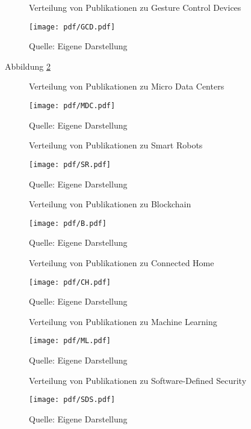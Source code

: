 \begin{figure}
	\centering
	\caption{Verteilung von Publikationen zu \glqq Gesture Control Devices\grqq}
	\texttt{[image: pdf/GCD.pdf]}
	\caption*{Quelle: Eigene Darstellung}
	\label{fig:gcd_pub}
\end{figure}

Abbildung \ref{fig:mdc_pub} 

\begin{figure}
	\centering
	\caption{Verteilung von Publikationen zu \glqq Micro Data Centers\grqq}
	\texttt{[image: pdf/MDC.pdf]}
	\caption*{Quelle: Eigene Darstellung}
	\label{fig:mdc_pub}
\end{figure}

\begin{figure}
	\centering
	\caption{Verteilung von Publikationen zu \glqq Smart Robots\grqq}
	\texttt{[image: pdf/SR.pdf]}
	\caption*{Quelle: Eigene Darstellung}
	\label{fig:sr_pub}
\end{figure}

\begin{figure}
	\centering
	\caption{Verteilung von Publikationen zu \glqq Blockchain\grqq}
	\texttt{[image: pdf/B.pdf]}
	\caption*{Quelle: Eigene Darstellung}
	\label{fig:b_pub}
\end{figure}

\begin{figure}
	\centering
	\caption{Verteilung von Publikationen zu \glqq Connected Home\grqq}
	\texttt{[image: pdf/CH.pdf]}
	\caption*{Quelle: Eigene Darstellung}
	\label{fig:ch_pub}
\end{figure}

\begin{figure}
	\centering
	\caption{Verteilung von Publikationen zu \glqq Machine Learning\grqq}
	\texttt{[image: pdf/ML.pdf]}
	\caption*{Quelle: Eigene Darstellung}
	\label{fig:ml_pub}
\end{figure}

\begin{figure}
	\centering
	\caption{Verteilung von Publikationen zu \glqq Software-Defined Security\grqq}
	\texttt{[image: pdf/SDS.pdf]}
	\caption*{Quelle: Eigene Darstellung}
	\label{fig:sds_pub}
\end{figure}

